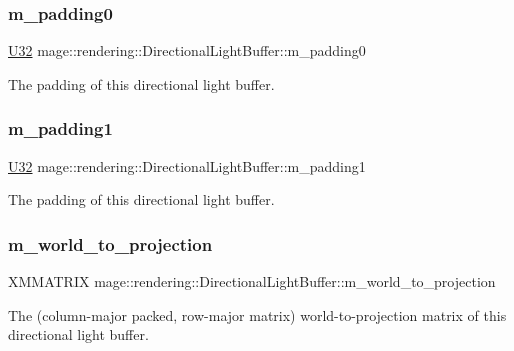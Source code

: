 \subsubsection{\texorpdfstring{m\+\_\+padding0}{m\_padding0}}
{\footnotesize\ttfamily \mbox{\hyperlink{namespacemage_a41c104c036fba3756a74e19f793eeaa1}{U32}} mage\+::rendering\+::\+Directional\+Light\+Buffer\+::m\+\_\+padding0}

The padding of this directional light buffer. \mbox{\label{structmage_1_1rendering_1_1_directional_light_buffer_a9e86dcc4f68340eb64408cf638996a69}} 
\subsubsection{\texorpdfstring{m\+\_\+padding1}{m\_padding1}}
{\footnotesize\ttfamily \mbox{\hyperlink{namespacemage_a41c104c036fba3756a74e19f793eeaa1}{U32}} mage\+::rendering\+::\+Directional\+Light\+Buffer\+::m\+\_\+padding1}

The padding of this directional light buffer. \mbox{\label{structmage_1_1rendering_1_1_directional_light_buffer_ae1c5a43c5dca80be889661a54fb3910b}} 
\subsubsection{\texorpdfstring{m\+\_\+world\+\_\+to\+\_\+projection}{m\_world\_to\_projection}}
{\footnotesize\ttfamily X\+M\+M\+A\+T\+R\+IX mage\+::rendering\+::\+Directional\+Light\+Buffer\+::m\+\_\+world\+\_\+to\+\_\+projection}

The (column-\/major packed, row-\/major matrix) world-\/to-\/projection matrix of this directional light buffer. 